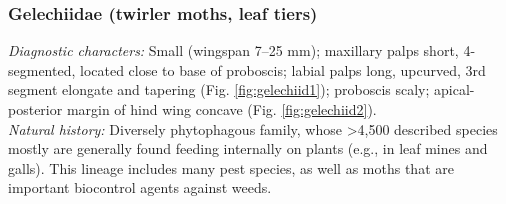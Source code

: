 \documentclass[letterpaper, 11pt]{article}
\begin{document}
\subsubsection{Gelechiidae (twirler moths, leaf tiers)}
\noindent{}\textit{Diagnostic characters:} Small (wingspan 7--25 mm); maxillary palps short, 4-segmented, located close to base of proboscis; labial palps long, upcurved, 3rd segment elongate and tapering (Fig. \ref{fig:gelechiid1}); proboscis scaly; apical-posterior margin of hind wing concave (Fig. \ref{fig:gelechiid2}).\\

\noindent{}\textit{Natural history:} Diversely phytophagous family, whose \textgreater4,500 described species mostly are generally found feeding internally on plants (e.g., in leaf mines and galls). This lineage includes many pest species, as well as moths that are important biocontrol agents against weeds. 
\end{document}

